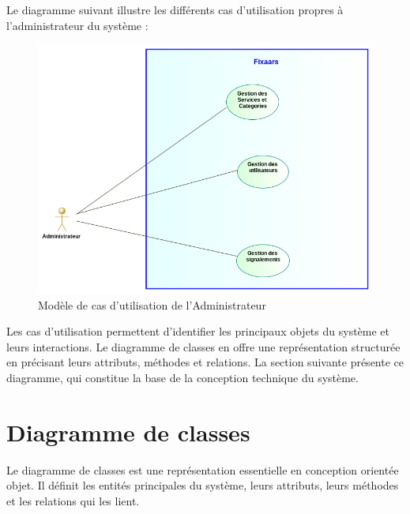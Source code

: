 \begin{enumerate}
        \vspace{0.39cm}

        Le diagramme suivant illustre les différents cas d’utilisation
propres à l'administrateur du système :

    \vspace{0.39cm}

    \begin{figure}[H]
    \begin{center}
    \includegraphics[width=17cm]{assets/diagrams/AdminUC.png}
    \end{center}
    \caption{Modèle de cas d'utilisation de l'Administrateur}
    \end{figure}
    
    \vspace{1.39cm}
\end{enumerate}

\vspace{0.5cm}

Les cas d'utilisation permettent d’identifier les principaux objets du système et leurs interactions. Le diagramme de classes en offre une représentation structurée en précisant leurs attributs, méthodes et relations. La section suivante présente ce diagramme, qui constitue la base de la conception technique du système.


\vspace{0.35cm}


\section{Diagramme de classes}
Le diagramme de classes est une représentation essentielle en conception orientée objet. Il définit les entités principales du système, leurs attributs, leurs méthodes et les relations qui les lient.
\\

